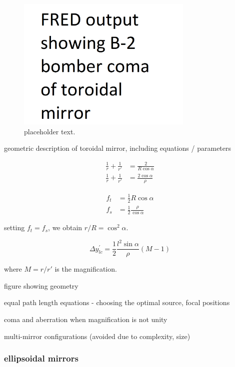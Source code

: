 \begin{figure}
	\centering
	\includegraphics[width=0.75\textwidth]{figures/chap2/TM_coma.png}
	\caption{placeholder text.}
	\label{fig:TM_coma}
\end{figure}

geometric description of toroidal mirror, including equations / parameters

\begin{align}
\frac{1}{r} + \frac{1}{r'} &= \frac{2}{R \cos \alpha} \\
\frac{1}{r} + \frac{1}{r'} &= \frac{2 \cos \alpha}{\rho}
\end{align}

\begin{align}
f_t &= \frac{1}{2} R \cos \alpha \\
f_s &= \frac{1}{2} \frac{\rho}{\cos \alpha}
\end{align}

setting $f_t = f_s$, we obtain $r/R = \cos^2 \alpha$.

\begin{equation}
\Delta y^{'}_{lc} = \frac{1}{2} \frac{l^2 \sin \alpha}{\rho} (M-1)
\end{equation}

where $M=r/r'$ is the magnification.

figure showing geometry

equal path length equations - choosing the optimal source, focal positions

coma and aberration when magnification is not unity

multi-mirror configurations (avoided due to complexity, size)

\subsubsection{ellipsoidal mirrors}

